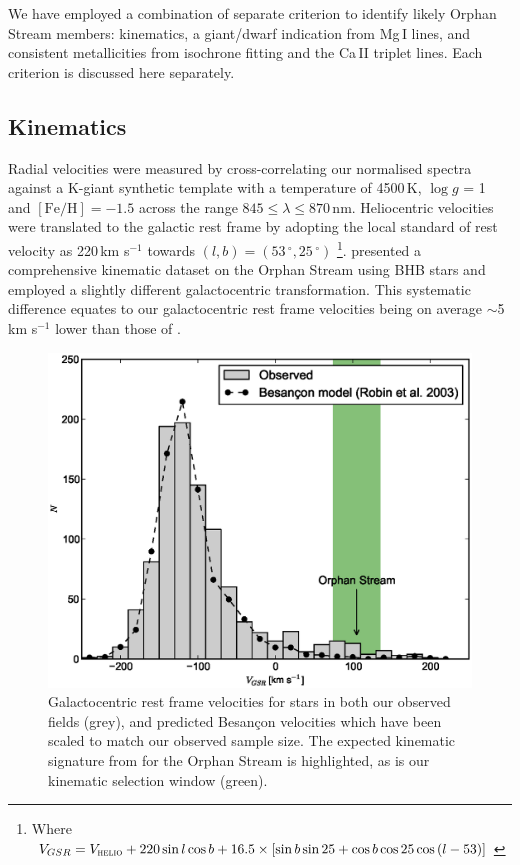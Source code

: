 \documentclass[10pt,apjl]{emulateapj}
\begin{document}
We have employed a combination of separate criterion to identify likely Orphan Stream members: kinematics, a giant/dwarf indication from Mg\,\textsc{I} lines, and consistent metallicities from isochrone fitting and the Ca\,\textsc{II} triplet lines. Each criterion is discussed here separately.

\subsection{Kinematics}
Radial velocities were measured by cross-correlating our normalised spectra against a K-giant synthetic template with a temperature of 4500\,K, $\log{g}$ = 1 and $[\mbox{Fe/H}] = -1.5$ across the range $845 \leq \lambda \leq 870$\,nm. Heliocentric velocities were translated to the galactic rest frame by adopting the local standard of rest velocity as 220\,km s$^{-1}$ towards $(l, b) = (53\,^\circ, 25\,^\circ)$ \citep{Kerr_Lynden-Bell_1986, Mihalas_Binney_1981}\footnote{Where $V_{GSR} = V_{\textsc{helio}} + 220\sin{l}\cos{b} + 16.5\times[\sin{b}\sin{25} + \cos{b}\cos{25}\cos{(l - 53)}]$}. \citet{Newberg_et-al_2010} presented a comprehensive kinematic dataset on the Orphan Stream using BHB stars and employed a slightly different galactocentric transformation. This systematic difference equates to our galactocentric rest frame velocities being on average $\sim$5\,km s$^{-1}$ lower than those of \citet{Newberg_et-al_2010}.

\begin{figure}[h]
	\includegraphics[width=\columnwidth]{./fig1.eps}
	\caption{Galactocentric rest frame velocities for stars in both our observed fields (grey), and predicted Besan\c{c}on velocities which have been scaled to match our observed sample size. The expected kinematic signature from \citet{Newberg_et-al_2010} for the Orphan Stream is highlighted, as is our kinematic selection window (green).}
	\label{fig:velocities}
\end{figure}
\end{document}
